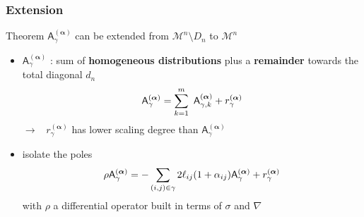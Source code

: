 \documentclass[9pt]{beamer}
\newcommand{\alphabd}{\boldsymbol{\alpha}}
\newcommand{\Mcal}{\mathcal{M}}
\newcommand{\Asf}{\mathsf{A}}
\begin{document}
\begin{frame}[label=theorem]

\frametitle{Extension}

\vfill

\begin{block}{Theorem}
\vspace*{-5pt}
$\Asf_\gamma^{(\alphabd)}$ can be extended from $\Mcal^n\setminus D_n$ to $\Mcal^n$
\end{block}

\vfill

\begin{itemize}
\setlength\itemsep{-1pt}

\item $\Asf_\gamma^{(\alphabd)}$ : sum of \textbf{homogeneous distributions} plus a \textbf{remainder} towards the total diagonal $d_n$
%
\vspace*{-7pt}
\begin{equation*}
\Asf_\gamma^{(\alphabd)} = \sum_{k=1}^m \ \Asf_{\gamma,k}^{(\alphabd)} + r_\gamma^{(\alphabd)}
\vspace*{-7pt}
\end{equation*}
%
$\to$ \ $r_\gamma^{(\alphabd)}$ has lower scaling degree than $\Asf_\gamma^{(\alphabd)}$

\item isolate the poles \hfill \hyperlink{details_theorem}{}
%
\vspace*{-5pt}
\begin{equation*}
\rho \Asf_\gamma^{(\alphabd)} = - \sum_{(i,j)\in\gamma} 2 \ell_{ij}(1+ \alpha_{ij}) \Asf_\gamma^{(\alphabd)} + r^{(\alphabd)}_\gamma
\vspace*{-5pt}
\end{equation*}
%
with $\rho$ a differential operator built in terms of $\sigma$ and $\nabla$ 

\end{itemize}

\vfill

\hfill \hyperlink{details_theorem_ex}{}

\end{frame}

\end{document}
